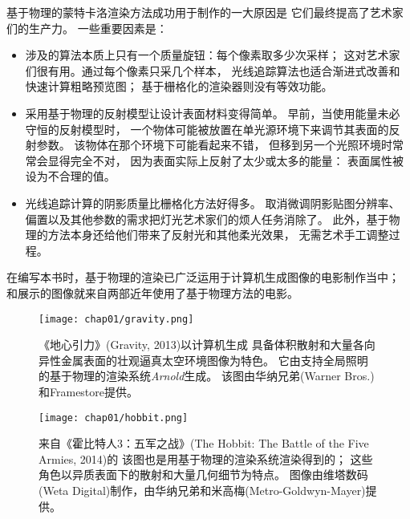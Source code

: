 基于物理的蒙特卡洛渲染方法成功用于制作的一大原因是
它们最终提高了艺术家们的生产力。
一些重要因素是：
\begin{itemize}
    \item 涉及的算法本质上只有一个质量旋钮：每个像素取多少次采样；
          这对艺术家们很有用。通过每个像素只采几个样本，
          光线追踪算法也适合渐进式改善和快速计算粗略预览图；
          基于栅格化的渲染器则没有等效功能。
    \item 采用基于物理的反射模型让设计表面材料变得简单。
          早前，当使用能量未必守恒的反射模型时，
          一个物体可能被放置在单光源环境下来调节其表面的反射参数。
          该物体在那个环境下可能看起来不错，
          但移到另一个光照环境时常常会显得完全不对，
          因为表面实际上反射了太少或太多的能量：
          表面属性被设为不合理的值。
    \item 光线追踪计算的阴影质量比栅格化方法好得多。
          取消微调阴影贴图分辨率、偏置以及其他参数的需求把灯光艺术家们的烦人任务消除了。
          此外，基于物理的方法本身还给他们带来了反射光和其他柔光效果，
          无需艺术手工调整过程。
\end{itemize}

在编写本书时，基于物理的渲染已广泛运用于计算机生成图像的电影制作当中；
和展示的图像就来自两部近年使用了基于物理方法的电影。
\begin{figure}[htbp]
    \centering\texttt{[image: chap01/gravity.png]}
    \caption{《地心引力》(Gravity, 2013)以计算机生成
        具备体积散射和大量各向异性金属表面的壮观逼真太空环境图像为特色。
        它由支持全局照明的基于物理的渲染系统\emph{Arnold}生成。
        该图由华纳兄弟(Warner Bros.)和Framestore提供。
    }
    \label{fig:1.22}
\end{figure}
\begin{figure}[htbp]
    \centering\texttt{[image: chap01/hobbit.png]}
    \caption{来自《霍比特人3：五军之战》(The Hobbit: The Battle of the Five Armies, 2014)的
        该图也是用基于物理的渲染系统渲染得到的；
        这些角色以异质表面下的散射和大量几何细节为特点。
        图像由维塔数码(Weta Digital)制作，由华纳兄弟和米高梅(Metro-Goldwyn-Mayer)提供。}
    \label{fig:1.23}
\end{figure}
